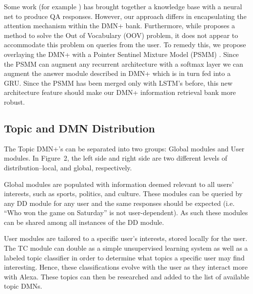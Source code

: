 \documentclass[10pt,twoside,twocolumn]{article}
\begin{document}
\noindent
Some work (for example \cite{Zhang2016}) has brought together a knowledge base with a neural net to produce QA responses. However, our approach differs in encapsulating the attention mechanism within the DMN+ bank. Furthermore, while \cite{Zhang2016} proposes a method to solve the Out of Vocabulary (OOV) problem, it does not appear to accommodate this problem on queries from the user. To remedy this, we propose overlaying the DMN+ with a Pointer Sentinel Mixture Model (PSMM) \cite{Merity2016}. Since the PSMM can augment any recurrent architecture with a softmax layer we can augment the answer module described in DMN+ \cite{Xiong2016} which is in turn fed into a GRU. Since the PSMM has been merged only with LSTM's before, this new architecture feature should make our DMN+ information retrieval bank more robust.



\subsection{Topic and DMN Distribution}
The Topic DMN+'s can be separated into two groups: Global modules and User modules. In Figure~2, the left side and right side are two different levels of distribution--local, and global, respectively.

\noindent
Global modules are populated with information deemed relevant to all users' interests, such as sports, politics, and culture. These modules can be queried by any DD module for any user and the same responses should be expected (i.e. ``Who won the game on Saturday'' is not user-dependent). As such these modules can be shared among all instances of the DD module.

\noindent
User modules are tailored to a specific user's interests, stored locally for the user. The TC module can double as a simple unsupervised learning system as well as a labeled topic classifier in order to determine what topics a specific user may find interesting. Hence, these classifications evolve with the user as they interact more with Alexa. These topics can then be researched and added to the list of available topic DMNs.
\end{document}
